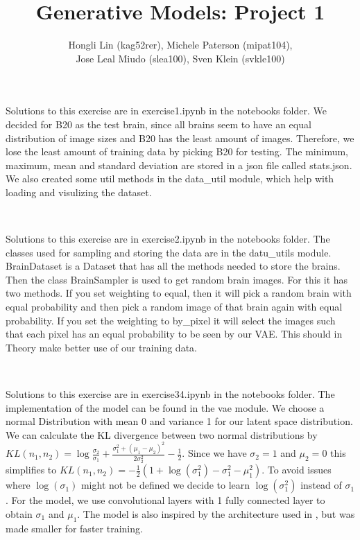 \documentclass[12pt]{article}
\begin{document}
 
%
%
 
\title{Generative Models: Project 1} %
\author{Hongli Lin (kag52rer), Michele Paterson (mipat104),\\ Jose Leal Miudo (slea100), Sven Klein (svkle100)} %
\maketitle
\begin{exercise}
Solutions to this exercise are in exercise1.ipynb in the notebooks folder. We decided for B20 as the test brain, since all brains seem to have an equal distribution of image sizes and B20 has the least amount of images. Therefore, we lose the least amount of training data by picking B20 for testing. The minimum, maximum, mean and standard deviation are stored in a json file called stats.json. We also created some util methods in the data\_util module, which help with loading and visulizing the dataset.\\
\end{exercise}
\\
\begin{exercise}
	Solutions to this exercise are in exercise2.ipynb in the notebooks folder. The classes used for sampling and storing the data are in the datu\_utils module. BrainDataset is a Dataset that has all the methods needed to store the brains. Then the class BrainSampler is used to get random brain images. For this it has two methods. If you set weighting to equal, then it will pick a random brain with equal probability and then pick a random image of that brain again with equal probability. If you set the weighting to by\_pixel it will select the images such that each pixel has an equal probability to be seen by our VAE. This should in Theory make better use of our training data.\\
\end{exercise}
\\
\begin{exercise}
	Solutions to this exercise are in exercise34.ipynb in the notebooks folder. The implementation of the model can be found in the vae module. We choose a normal Distribution with mean 0 and variance 1 for our latent space distribution. We can calculate the KL divergence between two normal distributions by $KL(n_1, n_2) = \log\frac{\sigma_2}{\sigma_1} + \frac{\sigma_1^2 + (\mu_1 - \mu_2)^2}{2 \sigma_2^2} - \frac{1}{2}$. Since we have $\sigma_2 = 1$ and $\mu_2 = 0$ this simplifies to $KL(n_1, n_2) = -\frac{1}{2} (1 + \log(\sigma_1^2) - \sigma_1^2 - \mu_1^2)$. To avoid issues where $\log(\sigma_1)$ might not be defined we decide to learn $\log(\sigma_1^2)$ instead of $\sigma_1$. For the model, we use convolutional layers with 1 fully connected layer to obtain $\sigma_1$ and $\mu_1$. The model is also inspired by the architecture used in \cite{higgins2017betavae}, but was made smaller for faster training.\\
\end{exercise}
\end{document}
